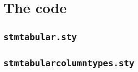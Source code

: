 \documentclass[%
  type=article,%
  layout=koma,%
  date=true,%
  hyperref=true,%
  listings=true,%
  math=true,%
]{stmtext}
\begin{document}
\newpage

\appendix

\newpage
\section{The code}

\subsection{\protect\texttt{stmtabular.sty}}



\subsection{\protect\texttt{stmtabularcolumntypes.sty}}


\end{document}
